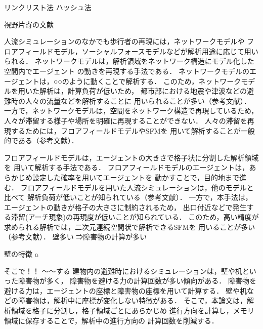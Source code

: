 
リンクリスト法\cite{cell_book1}\cite{cell_book}\cite{cellrenketu}
ハッシュ法\cite{hash}

視野片寄の文献\cite{katayose}


人流シミュレーションのなかでも歩行者の再現には，ネットワークモデルや
フロアフィールドモデル，ソーシャルフォースモデルなどが解析用途に応じて用いられる．
ネットワークモデルは，解析領域をネットワーク構造にモデル化した空間内でエージェント
の動きを再現する手法である．
ネットワークモデルのエージェントは，○○のように動くことで解析する．
このため，ネットワークモデルを用いた解析は，計算負荷が低いため，
都市部における地震や津波などの避難時の人々の流量などを解析することに
用いられることが多い（参考文献）．
一方で，ネットワークモデルは，空間をネットワーク構造で再現しているため，
人々が滞留する様子や場所を明確に再現することができない．
人々の滞留を再現するためには，フロアフィールドモデルやSFMを
用いて解析することが一般的である（参考文献）．



フロアフィールドモデルは，エージェントの大きさで格子状に分割した解析領域を
用いて解析する手法である．
フロアフィールドモデルのエージェントは，あらかじめ設定した確率を用いてエージェントを
動かすことで，目的地まで進む．
フロアフィールドモデルを用いた人流シミュレーションは，他のモデルと比べて
解析負荷が低いことが知られている（参考文献）．
一方で，本手法は，エージェントの動きが格子の大きさに制約されるため，
出口付近などで発生する滞留(アーチ現象)の再現度が低いことが知られている．
このため，高い精度が求められる解析では，二次元連続空間状で解析できるSFMを
用いることが多い（参考文献）．
壁多い
⇒障害物の計算が多い

壁の特徴
a

そこで！！
～～する
\fi
建物内の避難時におけるシミュレーションは，壁や机といった障害物が多く，
障害物を避ける力の計算回数が多い傾向がある．
障害物を避ける力は，エージェントの座標と障害物の座標を用いて計算する．
壁や机などの障害物は，解析中に座標が変化しない特徴がある．
そこで，本論文は，解析領域を格子に分割し，格子領域ごとにあらかじめ
進行方向を計算し，メモリ領域に保存することで，解析中の進行方向の
計算回数を削減する．


